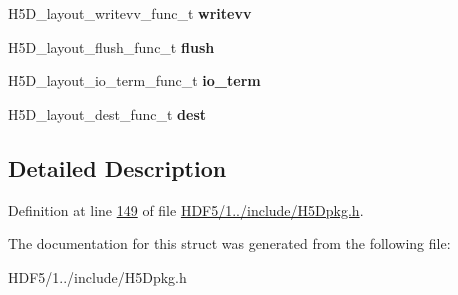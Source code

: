\begin{DoxyCompactItemize}
\mbox{\label{struct_h5_d__layout__ops__t_a333094e36d9c1872ab8c16a06615267c}} 
H5\+D\+\_\+layout\+\_\+writevv\+\_\+func\+\_\+t {\bfseries writevv}
\item 
\mbox{\label{struct_h5_d__layout__ops__t_afbf793584e9ac30f4d186b24d6be5363}} 
H5\+D\+\_\+layout\+\_\+flush\+\_\+func\+\_\+t {\bfseries flush}
\item 
\mbox{\label{struct_h5_d__layout__ops__t_a19a5ec242fe59c6f06a1cd234d81131e}} 
H5\+D\+\_\+layout\+\_\+io\+\_\+term\+\_\+func\+\_\+t {\bfseries io\+\_\+term}
\item 
\mbox{\label{struct_h5_d__layout__ops__t_a9ca4398d0625c0f13c758ce9592f89f1}} 
H5\+D\+\_\+layout\+\_\+dest\+\_\+func\+\_\+t {\bfseries dest}
\end{DoxyCompactItemize}


\subsection{Detailed Description}


Definition at line \hyperlink{_h_d_f5_21_810_81_2include_2_h5_dpkg_8h_source_l00149}{149} of file \hyperlink{_h_d_f5_21_810_81_2include_2_h5_dpkg_8h_source}{H\+D\+F5/1../include/\+H5\+Dpkg.\+h}.



The documentation for this struct was generated from the following file\+:\begin{DoxyCompactItemize}
\item 
H\+D\+F5/1../include/\+H5\+Dpkg.\+h\end{DoxyCompactItemize}

